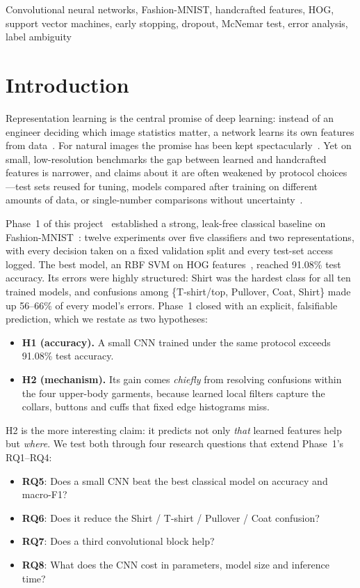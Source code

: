\documentclass[conference]{IEEEtran}
\newcommand{\RQ}[1]{\textbf{RQ#1}}
\begin{document}
\begin{IEEEkeywords}
Convolutional neural networks, Fashion-MNIST, handcrafted features, HOG, support vector machines, early stopping,
dropout, McNemar test, error analysis, label ambiguity
\end{IEEEkeywords}

\section{Introduction}
\label{sec:intro}
Representation learning is the central promise of deep learning: instead of an engineer deciding which image
statistics matter, a network learns its own features from data~\cite{lecun2015deep}. For natural images the promise has
been kept spectacularly~\cite{krizhevsky2012imagenet,simonyan2015very,he2016deep}. Yet on small, low-resolution
benchmarks the gap between learned and handcrafted features is narrower, and claims about it are often weakened by
protocol choices---test sets reused for tuning, models compared after training on different amounts of data, or
single-number comparisons without uncertainty~\cite{kaufman2012leakage,cawley2010overfitting,bouthillier2021accounting}.

Phase~1 of this project~\cite{phase1report} established a strong, leak-free classical baseline on
Fashion-MNIST~\cite{xiao2017fashion}: twelve experiments over five classifiers and two representations, with every
decision taken on a fixed validation split and every test-set access logged. The best model, an RBF SVM on HOG
features~\cite{dalal2005histograms,cortes1995support}, reached 91.08\% test accuracy. Its errors were highly structured:
Shirt was the hardest class for all ten trained models, and confusions among \{T-shirt/top, Pullover, Coat, Shirt\} made up
56--66\% of every model's errors. Phase~1 closed with an explicit, falsifiable prediction, which we restate as two
hypotheses:
\begin{itemize}
  \item \textbf{H1 (accuracy).} A small CNN trained under the same protocol exceeds 91.08\% test accuracy.
  \item \textbf{H2 (mechanism).} Its gain comes \emph{chiefly} from resolving confusions within the four upper-body
        garments, because learned local filters capture the collars, buttons and cuffs that fixed edge histograms miss.
\end{itemize}
H2 is the more interesting claim: it predicts not only \emph{that} learned features help but \emph{where}. We test both
through four research questions that extend Phase~1's RQ1--RQ4:
\begin{itemize}
  \item \RQ{5}: Does a small CNN beat the best classical model on accuracy and macro-F1?
  \item \RQ{6}: Does it reduce the Shirt / T-shirt / Pullover / Coat confusion?
  \item \RQ{7}: Does a third convolutional block help?
  \item \RQ{8}: What does the CNN cost in parameters, model size and inference time?
\end{itemize}
\end{document}
